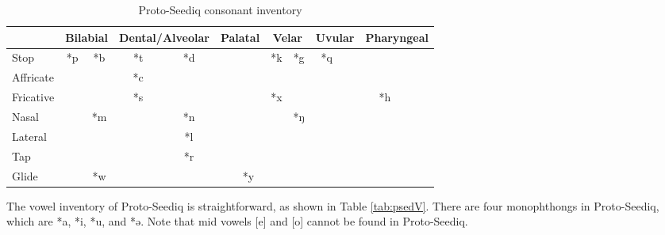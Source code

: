 \documentclass[12pt]{article}
\newcommand{\psedf}{Proto-Seediq\xspace}
\begin{document}
\begin{table}[!htbp]
\centering
\caption{Proto-Seediq consonant inventory}
\label{tab:psedC}
\begin{tabular}{l|cc|cc|cc|cc|cc|cc}
\hline
                    & \multicolumn{2}{c|}{Bilabial} & \multicolumn{2}{c|}{Dental/Alveolar} & \multicolumn{2}{c|}{Palatal} & \multicolumn{2}{c|}{Velar} & \multicolumn{2}{c|}{Uvular} & \multicolumn{2}{c}{Pharyngeal} \\ \hline
Stop                & *p            & *b           & *t               & *d               &             &               & *k          & *g          & *q            &            &                 &              \\
Affricate           &               &              & *c               &                  &             &               &             &             &               &            &                 &              \\
Fricative           &               &              & *s               &                  &             &               & *x          &             &               &            & *h              &              \\
Nasal               &               & *m           &                  & *n               &             &               &             & *ŋ          &               &            &                 &              \\
Lateral  &               &              &                  & *l               &             &               &             &             &               &            &                 &              \\
Tap                 &               &              &                  & *r               &             &               &             &             &               &            &                 &              \\
Glide               &               & *w           &                  &                  &             & *y            &             &             &               &            &                 &              \\ \hline
\end{tabular}
\end{table}

The vowel inventory of \psedf is straightforward, as shown in Table \ref{tab:psedV}. There are four monophthongs in \psedf, which are *a, *i, *u, and *ə. Note that mid vowels [e] and [o] cannot be found in \psedf. 
\end{document}
